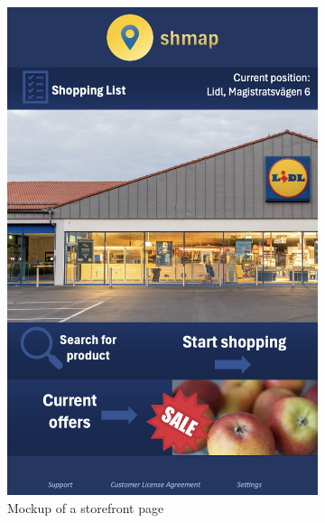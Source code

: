 \documentclass[titlepage]{article}
\begin{document}
\begin{figure}[h!]
\begin{subfigure}[b]{0.3\linewidth}
        \includegraphics[width=\textwidth]{StoreHome.png}
    \caption{Mockup of a storefront page}
      \end{subfigure}
    \begin{subfigure}[b]{0.3\linewidth}

\end{subfigure}
\end{figure}
\end{document}
